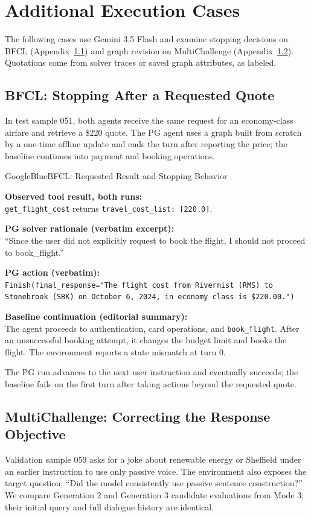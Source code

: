 \section{Additional Execution Cases}
\label{app:additional_examples}
The following cases use Gemini 3.5 Flash and examine stopping decisions on BFCL (Appendix~\ref{app:bfcl_stopping}) and graph revision on MultiChallenge (Appendix~\ref{app:multichallenge_edits}). Quotations come from solver traces or saved graph attributes, as labeled.

\subsection{BFCL: Stopping After a Requested Quote}
\label{app:bfcl_stopping}
In test sample 051, both agents receive the same request for an economy-class airfare and retrieve a \$220 quote. The PG agent uses a graph built from scratch by a one-time offline update and ends the turn after reporting the price; the baseline continues into payment and booking operations.

\begin{tracebox}{GoogleBlue}{BFCL: Requested Result and Stopping Behavior}
\footnotesize\raggedright
\textbf{Observed tool result, both runs:}\\
\texttt{get\_flight\_cost} returns \texttt{travel\_cost\_list: [220.0]}.

\smallskip
\textbf{PG solver rationale (verbatim excerpt):}\\
``Since the user did not explicitly request to book the flight, I should not proceed to book\_flight.''

\smallskip
\textbf{PG action (verbatim):}\\
\texttt{Finish(final\_response="The flight cost from Rivermist (RMS) to Stonebrook (SBK) on October 6, 2024, in economy class is \$220.00.")}

\smallskip
\textbf{Baseline continuation (editorial summary):}\\
The agent proceeds to authentication, card operations, and \texttt{book\_flight}. After an unsuccessful booking attempt, it changes the budget limit and books the flight. The environment reports a state mismatch at turn 0.
\end{tracebox}

The PG run advances to the next user instruction and eventually succeeds; the baseline fails on the first turn after taking actions beyond the requested quote.

\subsection{MultiChallenge: Correcting the Response Objective}
\label{app:multichallenge_edits}
Validation sample 059 asks for a joke about renewable energy or Sheffield under an earlier instruction to use only passive voice. The environment also exposes the target question, ``Did the model consistently use passive sentence construction?'' We compare Generation 2 and Generation 3 candidate evaluations from Mode 3; their initial query and full dialogue history are identical.

